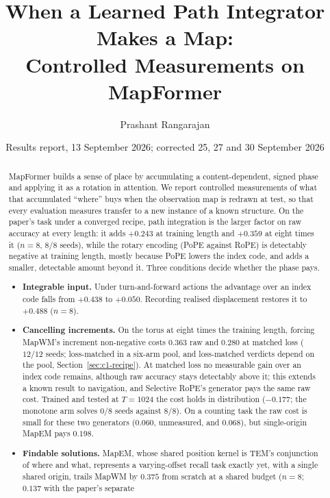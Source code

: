 \documentclass[10pt]{article}
\title{When a Learned Path Integrator Makes a Map:\\
\large Controlled Measurements on MapFormer}
\date{Results report, 13 September 2026; corrected 25, 27 and 30 September 2026}
\author{Prashant Rangarajan}
\begin{document}
\maketitle

\begin{abstract}
\noindent
MapFormer builds a sense of place by accumulating a content-dependent, signed phase and
applying it as a rotation in attention. We report controlled measurements of what that
accumulated ``where'' buys when the observation map is redrawn at test, so that every
evaluation measures transfer to a new instance of a known structure. On the paper's task under a converged recipe, path integration is the larger factor on raw accuracy
at every length: it adds $+0.243$ at training length and $+0.359$ at eight times it ($n=8$, $8/8$ seeds),
while the rotary encoding (PoPE against RoPE) is detectably negative at training length, mostly because
PoPE lowers the index code, and adds a smaller, detectable amount beyond it.
Three conditions decide whether the phase pays.
\begin{itemize}[leftmargin=1.2em]
\item \textbf{Integrable input.} Under turn-and-forward actions the advantage over an index code
falls from $+0.438$ to $+0.050$. Recording realised displacement restores it to $+0.488$ ($n=8$).
\item \textbf{Cancelling increments.} On the torus at eight times the training length, forcing
MapWM's increment non-negative costs $0.363$ raw and $0.280$ at matched loss ($12/12$ seeds; loss-matched in a six-arm pool, and
loss-matched verdicts depend on the pool, Section~\ref{sec:c1-recipe}). At
matched loss no measurable gain over an index code remains, although raw accuracy stays detectably
above it; this extends a known result to navigation, and Selective RoPE's generator pays the same raw
cost. Trained and tested at $T=1024$ the cost holds in distribution ($-0.177$; the monotone arm solves
$0/8$ seeds against $8/8$). On a counting task the raw cost is small for these two generators ($0.060$, unmeasured, and
$0.068$), but single-origin MapEM pays $0.198$.
\item \textbf{Findable solutions.} MapEM, whose shared position kernel is TEM's conjunction of
where and what, represents a varying-offset recall task exactly yet, with a single shared origin,
trails MapWM by $0.375$ from scratch at a shared budget ($n=8$; $0.137$ with the paper's separate

\end{itemize}
\end{abstract}
\end{document}
